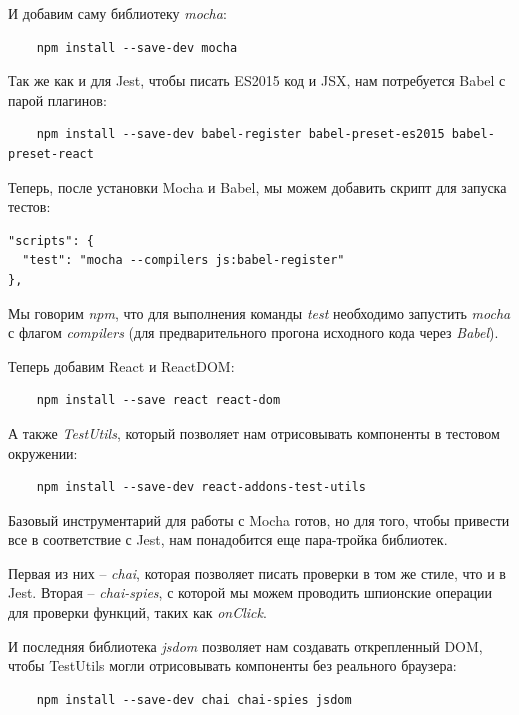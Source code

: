И добавим саму библиотеку \textit{mocha}:

\begin{lstlisting}
	npm install --save-dev mocha
\end{lstlisting}

Так же как и для Jest, чтобы писать ES2015 код и JSX, нам потребуется Babel с парой плагинов:

\begin{lstlisting}
	npm install --save-dev babel-register babel-preset-es2015 babel-preset-react
\end{lstlisting}

Теперь, после установки Mocha и Babel, мы можем добавить скрипт для запуска тестов:

\begin{lstlisting}
"scripts": {
  "test": "mocha --compilers js:babel-register"
},	
\end{lstlisting}

Мы говорим \textit{npm}, что для выполнения команды \textit{test} необходимо запустить \textit{mocha} с флагом \textit{compilers} (для предварительного прогона исходного кода через \textit{Babel}).

Теперь добавим React и ReactDOM:

\begin{lstlisting}
	npm install --save react react-dom
\end{lstlisting}

А также \textit{TestUtils}, который позволяет нам отрисовывать компоненты в тестовом окружении:

\begin{lstlisting}
	npm install --save-dev react-addons-test-utils
\end{lstlisting}

Базовый инструментарий для работы с Mocha готов, но для того, чтобы привести все в соответствие с Jest, нам понадобится еще пара-тройка библиотек.

Первая из них -- \textit{chai}, которая позволяет писать проверки в том же стиле, что и в Jest. Вторая -- \textit{chai-spies}, с которой мы можем проводить шпионские операции для проверки функций, таких как \textit{onClick}. 

И последняя библиотека \textit{jsdom} позволяет нам создавать открепленный DOM, чтобы TestUtils могли отрисовывать компоненты без реального браузера:

\begin{lstlisting}
	npm install --save-dev chai chai-spies jsdom
\end{lstlisting}

